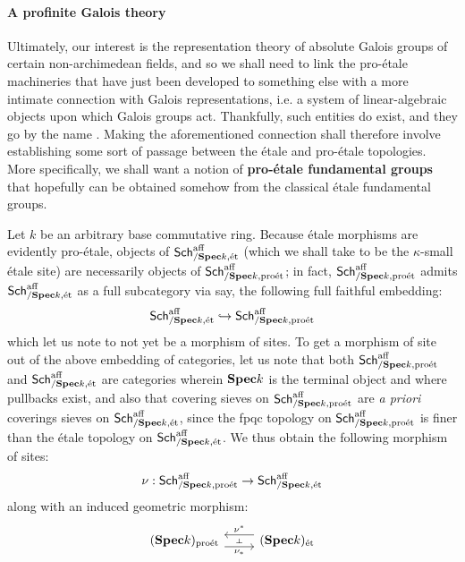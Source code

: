                 \paragraph{A profinite Galois theory}
                    Ultimately, our interest is the representation theory of absolute Galois groups of certain non-archimedean fields, and so we shall need to link the pro-\'etale machineries that have just been developed to something else with a more intimate connection with Galois representations, i.e. a system of linear-algebraic objects upon which Galois groups act. Thankfully, such entities do exist, and they go by the name . Making the aforementioned connection shall therefore involve establishing some sort of passage between the \'etale and pro-\'etale topologies. More specifically, we shall want a notion of \textbf{pro-\'etale fundamental groups} that hopefully can be obtained somehow from the classical \'etale fundamental groups. 
                    
                    \begin{remark} \label{remark: etale_comparison_site_morphism}
                        Let $k$ be an arbitrary base commutative ring. Because \'etale morphisms are evidently pro-\'etale, objects of $\mathsf{Sch}^{\mathrm{aff}}_{/\mathbf{Spec} k, \mathrm{\acute{e}t}}$ (which we shall take to be the $\kappa$-small \'etale site) are necessarily objects of $\mathsf{Sch}^{\mathrm{aff}}_{/\mathbf{Spec} k, \mathrm{pro\acute{e}t}}$; in fact, $\mathsf{Sch}^{\mathrm{aff}}_{/\mathbf{Spec} k, \mathrm{pro\acute{e}t}}$ admits $\mathsf{Sch}^{\mathrm{aff}}_{/\mathbf{Spec} k, \mathrm{\acute{e}t}}$ as a full subcategory via say, the following full faithful embedding:
                            $$\mathsf{Sch}^{\mathrm{aff}}_{/\mathbf{Spec} k, \mathrm{\acute{e}t}} \hookrightarrow \mathsf{Sch}^{\mathrm{aff}}_{/\mathbf{Spec} k, \mathrm{pro\acute{e}t}}$$
                        which let us note to not yet be a morphism of sites. To get a morphism of site out of the above embedding of categories, let us note that both $\mathsf{Sch}^{\mathrm{aff}}_{/\mathbf{Spec} k, \mathrm{pro\acute{e}t}}$ and $\mathsf{Sch}^{\mathrm{aff}}_{/\mathbf{Spec} k, \mathrm{\acute{e}t}}$ are categories wherein $\mathbf{Spec} k$ is the terminal object and where pullbacks exist, and also that covering sieves on $\mathsf{Sch}^{\mathrm{aff}}_{/\mathbf{Spec} k, \mathrm{pro\acute{e}t}}$ are \textit{a priori} coverings sieves on $\mathsf{Sch}^{\mathrm{aff}}_{/\mathbf{Spec} k, \mathrm{\acute{e}t}}$, since the fpqc topology on $\mathsf{Sch}^{\mathrm{aff}}_{/\mathbf{Spec} k, \mathrm{pro\acute{e}t}}$ is finer than the \'etale topology on $\mathsf{Sch}^{\mathrm{aff}}_{/\mathbf{Spec} k, \mathrm{\acute{e}t}}$. We thus obtain the following morphism of sites:
                            $$\nu: \mathsf{Sch}^{\mathrm{aff}}_{/\mathbf{Spec} k, \mathrm{pro\acute{e}t}} \to \mathsf{Sch}^{\mathrm{aff}}_{/\mathbf{Spec} k, \mathrm{\acute{e}t}}$$
                        along with an induced geometric morphism:
                            $$
                                \begin{tikzcd}
                                	{(\Spec k)_{\proet}} & {(\Spec k)_{\et}}
                                	\arrow[""{name=0, anchor=center, inner sep=0}, "{\nu_*}"', shift right=2, from=1-1, to=1-2]
                                	\arrow[""{name=1, anchor=center, inner sep=0}, "{\nu^*}"', shift right=2, from=1-2, to=1-1]
                                	\arrow["\dashv"{anchor=center, rotate=-90}, draw=none, from=1, to=0]
                                \end{tikzcd}
                            $$
                    \end{remark}
                    
